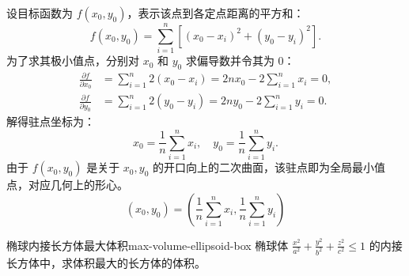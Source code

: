 \begin{solution}
    设目标函数为 $f(x_0, y_0)$，表示该点到各定点距离的平方和：
    \begin{equation}
        f(x_0, y_0) = \sum_{i=1}^{n} \left[ (x_0 - x_i)^2 + (y_0 - y_i)^2 \right].
    \end{equation}
    为了求其极小值点，分别对 $x_0$ 和 $y_0$ 求偏导数并令其为 $0$：
    \begin{equation}
        \begin{aligned}
            \frac{\partial f}{\partial x_0} & = \sum_{i=1}^{n} 2(x_0 - x_i) = 2nx_0 - 2\sum_{i=1}^{n} x_i = 0, \\
            \frac{\partial f}{\partial y_0} & = \sum_{i=1}^{n} 2(y_0 - y_i) = 2ny_0 - 2\sum_{i=1}^{n} y_i = 0.
        \end{aligned}
    \end{equation}
    解得驻点坐标为：
    \begin{equation}
        x_0 = \frac{1}{n} \sum_{i=1}^{n} x_i, \quad y_0 = \frac{1}{n} \sum_{i=1}^{n} y_i.
    \end{equation}
    由于 $f(x_0, y_0)$ 是关于 $x_0, y_0$ 的开口向上的二次曲面，该驻点即为全局最小值点，对应几何上的形心。
    \begin{equation}
        \boxed{(x_0, y_0) = \left( \frac{1}{n} \sum_{i=1}^{n} x_i, \frac{1}{n} \sum_{i=1}^{n} y_i \right)}
    \end{equation}
\end{solution}


\begin{problem}{椭球内接长方体最大体积}{max-volume-ellipsoid-box}
    椭球体 $\frac{x^2}{a^2} + \frac{y^2}{b^2} + \frac{z^2}{c^2} \le 1$ 的内接长方体中，求体积最大的长方体的体积。
\end{problem}

